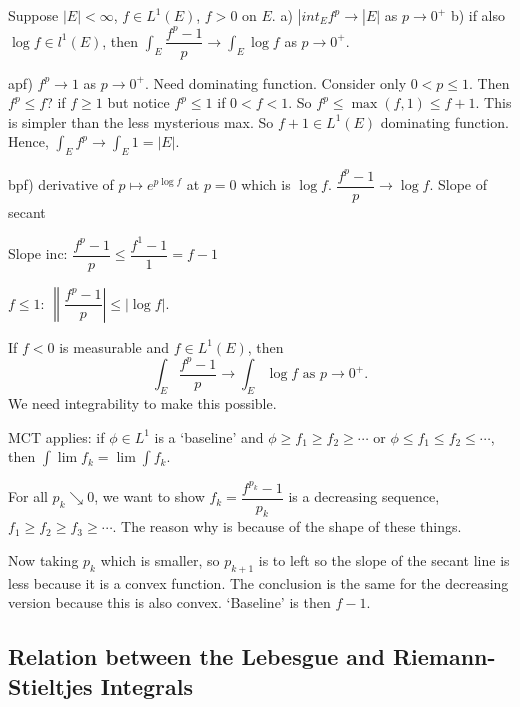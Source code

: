 \begin{ex}
Suppose $|E|<\infty$, $f \in L^1(E)$, $f>0$ on $E$.
a) $|int_E f^p \to |E|$ as $p \to 0^+$
b) if also $\log f \in l^1(E)$, then $\int_E \dfrac{f^p-1}{p} \to \int_E \log f$ as $p \to 0^+$.


apf) $f^p \to 1$ as $p \to 0^+$. Need dominating function. Consider only $0<p \leq 1$. Then $f^p \leq f$? if $f \geq 1$ but notice $f^p \leq 1$ if $0<f<1$. So $f^p \leq \max(f,1) \leq f+1$. This is simpler than the less mysterious max. So $f+1 \in L^1(E)$ dominating function. Hence, $\int_E f^p \to \int_E 1= |E|$. 

bpf) derivative of $p \mapsto e^{p \log f}$ at $p=0$ which is $\log f$. $\dfrac{f^p-1}{p} \to \log f$. Slope of secant 


Slope inc: $\dfrac{f^p-1}{p} \leq \dfrac{f^1-1}{1}= f-1$

$f \leq 1$: $\left\| \dfrac{f^p-1}{p} \right| \leq |\log f|$.



If $f<0$ is measurable and $f \in L^1(E)$, then
	\[
	\int_E \dfrac{f^p-1}{p} \to \int_E \log f \text{ as } p \to 0^+.
	\]
We need integrability to make this possible. 


MCT applies: 
if $\phi \in L^1$ is a `baseline' and $\phi \geq f_1 \geq f_2 \geq \cdots$ or 
$\phi \leq f_1 \leq f_2 \leq \cdots$, then $\int \lim f_k = \lim \int f_k$. 

For all $p_k \searrow 0$, we want to show $f_k= \dfrac{f^{p_k} - 1}{p_k}$ is a decreasing sequence, $f_1 \geq f_2 \geq f_3 \geq \cdots$. The reason why is because of the shape of these things. 


Now taking $p_k$ which is smaller, so $p_{k+1}$ is to left so the slope of the secant line is less because it is a convex function. The conclusion is the same for the decreasing version because this is also convex. `Baseline' is then $f-1$. 
\end{ex}









\subsection{Relation between the Lebesgue and Riemann-Stieltjes Integrals}


